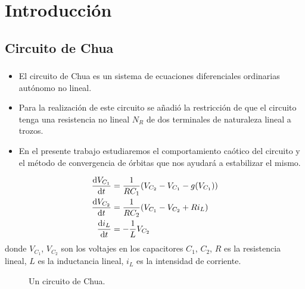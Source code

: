 \section{Introducción}

\subsection{Circuito de Chua}

\begin{frame}
	\frametitle{\subsecname}

	\begin{itemize}
		\item

		      El \alert{circuito de Chua} es un sistema de ecuaciones diferenciales
		      ordinarias autónomo no lineal.

		\item

		      Para la realización de este circuito se añadió la restricción de que
		      el circuito tenga una \alert{resistencia no lineal} $N_{R}$ de dos
		      terminales de naturaleza lineal a trozos.

		\item

		      En el presente trabajo estudiaremos el comportamiento caótico del
		      circuito y el \alert{método de convergencia de órbitas} que nos
		      ayudará a estabilizar el mismo.
	\end{itemize}

	\begin{minipage}{0.45\textwidth}
		\begin{align*}
			\diff{V_{C_{1}}}{t} & =\frac{1}{RC_{1}}(V_{C_{2}} - V_{C_{1}} - g(V_{C_{1}})) \\
			\diff{V_{C_{2}}}{t} & =\frac{1}{RC_{2}}(V_{C_{1}} - V_{C_{2}} + Ri_{L})       \\
			\diff{i_{L}}{t}     & =-\frac{1}{L}V_{C_{2}}
		\end{align*}
		donde $V_{C_{1}}$, $V_{C_{2}}$ son los voltajes en los capacitores $C_{1}$, $C_{2}$,
		$R$ es la resistencia lineal,
		$L$ es la inductancia lineal, $i_{L}$ es la intensidad de corriente.
	\end{minipage}
	\begin{minipage}{0.45\textwidth}
		\begin{figure}[ht!]
			\centering
			
			\caption{Un circuito de Chua.}\label{fig:chua_circuit}
		\end{figure}
	\end{minipage}

\end{frame}

